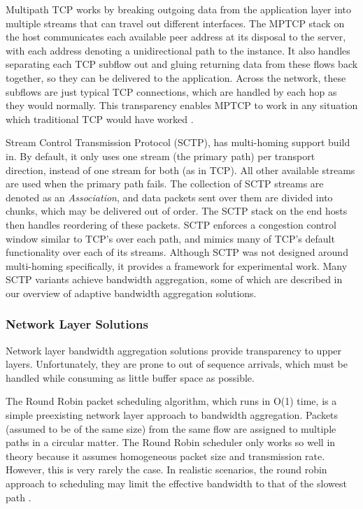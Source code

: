 \documentclass[12pt]{article}
\begin{document}
		Multipath TCP works by breaking outgoing data from the application layer into multiple streams that can travel out different interfaces. The MPTCP stack on the host communicates each available peer address at its disposal to the server, with each address denoting a unidirectional path to the instance. It also handles separating each TCP subflow out and gluing returning data from these flows back together, so they can be delivered to the application. Across the network, these subflows are just typical TCP connections, which are handled by each hop as they would normally. This transparency enables MPTCP to work in any situation which traditional TCP would have worked \cite{MPTCPNetsy}.

		Stream Control Transmission Protocol (SCTP), has multi-homing support build in. By default, it only uses one stream (the primary path) per transport direction, instead of one stream for both (as in TCP). All other available streams are used when the primary path fails. The collection of SCTP streams are denoted as an {\it Association}, and data packets sent over them are divided into chunks, which may be delivered out of order. The SCTP stack on the end hosts then handles reordering of these packets. SCTP \cite{5763587} enforces a congestion control window similar to TCP's over each path, and mimics many of TCP's default functionality over each of its streams. Although SCTP was not designed around multi-homing specifically, it provides a framework for experimental work. Many SCTP variants achieve bandwidth aggregation, some of which are described in our overview of adaptive bandwidth aggregation solutions.

	\subsubsection{Network Layer Solutions}

		Network layer bandwidth aggregation solutions provide transparency to upper layers. Unfortunately, they are prone to out of sequence arrivals, which must be handled while consuming as little buffer space as possible.

		The Round Robin packet scheduling algorithm, which runs in O(1) time, is a simple preexisting network layer approach to bandwidth aggregation. Packets (assumed to be of the same size) from the same flow are assigned to multiple paths in a circular matter. The Round Robin scheduler only works so well in theory because it assumes homogeneous packet size and transmission rate. However, this is very rarely the case. In realistic scenarios, the round robin approach to scheduling may limit the effective bandwidth to that of the slowest path \cite{Ramaboli20121674}.
\end{document}
